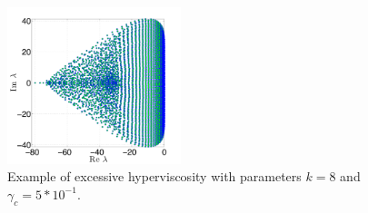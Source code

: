 \documentclass{report}
\begin{document}
\begin{figure}
\centering
	\includegraphics[width=0.45\textwidth]{../figures/paper1/cosine_bell/eigs_N4096_n101_HV_k8_gamma5e_m1.pdf}
	\caption{Example of excessive hyperviscosity with parameters $k=8$ and $\gamma_c = 5*10^{-1}$.} %
	\label{fig:cosine_eigs_hv_m1}
\end{figure}
\end{document}
